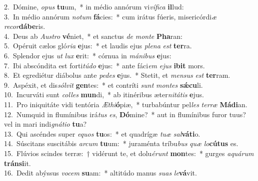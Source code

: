 {2.~}Dómine, \textit{o}\textit{pus} \textbf{tu}um,~* in médio annórum vi\textit{ví}\textit{fi}\textit{ca} \textbf{il}lud:\\
{3.~}In médio annórum \textit{no}\textit{tum} \textbf{fá}cies:~* cum irátus fúeris, misericórdi\textit{æ} \textit{re}\textit{cor}\textbf{dá}\textbf{be}ris.\\
{4.~}Deus ab \textit{Au}\textit{stro} \textbf{vé}niet,~* et sanctus \textit{de} \textit{mon}\textit{te} \textbf{Pha}ran:\\
{5.~}Opéruit cælos gló\textit{ri}\textit{a} \textbf{e}jus:~* et laudis ejus \textit{ple}\textit{na} \textit{est} \textbf{ter}ra.\\
{6.~}Splendor ejus \textit{ut} \textit{lux} \textbf{e}rit:~* córnua in \textit{má}\textit{ni}\textit{bus} \textbf{e}jus:\\
{7.~}Ibi abscóndita est forti\textit{tú}\textit{do} \textbf{e}jus:~* ante fáci\textit{em} \textit{e}\textit{jus} \textbf{i}\textbf{bit} mors.\\
{8.~}Et egrediétur diábolus ante \textit{pe}\textit{des} \textbf{e}jus.~* Stetit, et \textit{men}\textit{sus} \textit{est} \textbf{ter}ram.\\
{9.~}Aspéxit, et dis\textit{sól}\textit{vit} \textbf{gen}tes:~* et contríti \textit{sunt} \textit{mon}\textit{tes} \textbf{sǽ}\textbf{cu}li.\\
{10.~}Incurváti sunt \textit{col}\textit{les} \textbf{mun}di,~* ab itinéribus æter\textit{ni}\textit{tá}\textit{tis} \textbf{e}jus.\\
{11.~}Pro iniquitáte vidi tentória \textit{Æ}\textit{thi}\textbf{ó}piæ,~* turbabúntur pel\textit{les} \textit{ter}\textit{ræ} \textbf{Má}\textbf{di}an.\\
{12.~}Numquid in flumínibus irá\textit{tus} \textit{es}, \textbf{Dó}mine?~* aut in flumínibus furor tuus? vel in mari indi\textit{gná}\textit{ti}\textit{o} \textbf{tu}a?\\
{13.~}Qui ascéndes super \textit{e}\textit{quos} \textbf{tu}os:~* et quadrígæ \textit{tu}\textit{æ} \textit{sal}\textbf{vá}\textbf{ti}o.\\
{14.~}Súscitans suscitábis \textit{ar}\textit{cum} \textbf{tu}um:~* juraménta tríbu\textit{bus} \textit{quæ} \textit{lo}\textbf{cú}\textbf{tus} es.\\
{15.~}Flúvios scindes terræ:~† vidérunt te, et dolu\textit{é}\textit{runt} \textbf{mon}tes:~* gurges \textit{a}\textit{quá}\textit{rum} \textbf{trán}\textbf{si}it.\\
{16.~}Dedit abýssus \textit{vo}\textit{cem} \textbf{su}am:~* altitúdo manus \textit{su}\textit{as} \textit{le}\textbf{vá}vit.\\
